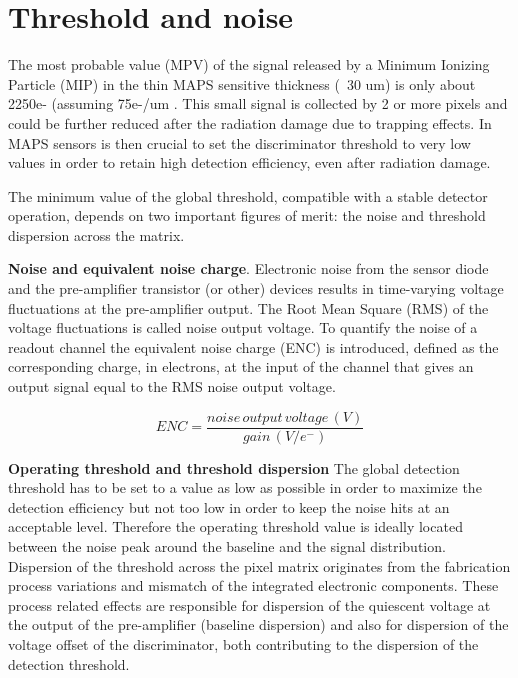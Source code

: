 
\section{Threshold and noise} \label{thresh_noise}




The most probable value (MPV) of the signal released by a Minimum Ionizing Particle (MIP) in the thin MAPS sensitive thickness (~30 um) is only about 2250e- (assuming 75e-/um \cite{wermes_book2020}. This small signal is collected by 2 or more pixels and could be further reduced after the radiation damage due to trapping effects. 
In MAPS sensors is then crucial to set the discriminator threshold to very low values in order to retain high detection efficiency, even after radiation damage.

The minimum value of the global threshold, compatible with a stable detector operation, depends on two important figures of merit: the noise and threshold dispersion across the matrix. 

\textbf{Noise and equivalent noise charge}. Electronic noise from the sensor diode and the pre-amplifier transistor (or other) devices results in time-varying voltage fluctuations at the pre-amplifier output. The Root Mean Square (RMS) of the voltage fluctuations is called noise output voltage.  
To quantify the noise of a readout channel the equivalent noise charge (ENC) is introduced, defined as the corresponding charge, in electrons, at the input of the channel that gives an output signal equal to the RMS noise output voltage.

\begin{equation}
ENC = \frac{noise \, output \, voltage \, (V)}{gain \, (V/e^{-})} 
\label{eq:ENC}
\end{equation}

\textbf{Operating threshold and threshold dispersion} 
The global detection threshold has to be set to a value as low as possible in order to maximize the detection efficiency but not too low in order to keep the noise hits at an acceptable level.  Therefore the operating threshold value is ideally located between the noise peak around the baseline and the signal distribution. 
Dispersion of the threshold across the pixel matrix originates from the fabrication process variations and mismatch of the integrated electronic components. These process related effects are responsible for dispersion of the quiescent voltage at the output of the pre-amplifier (baseline dispersion) and also for dispersion of the voltage offset of the discriminator, both contributing to the dispersion of the detection threshold. 

